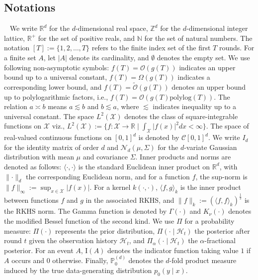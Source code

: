 \documentclass[final,12pt]{colt2026} %
\begin{document}
\subsection{Notations}~\label{sec:notation}
We write $\mathbb{R}^{d}$ for the $d$-dimensional real space, $\mathbb{Z}^{d}$ for the $d$-dimensional integer lattice, $\mathbb{R}^{+}$ for the set of positive reals, and $\mathbb{N}$ for the set of natural numbers. The notation $[T]:=\{1, 2, \ldots, T\}$ refers to the finite index set of the first $T$ rounds. For a finite set $A$, let $|A|$ denote its cardinality, and $\emptyset$ denotes the empty set. We use following non-asymptotic symbols: $f(T) = \mathcal{O}(g(T))$ indicates an upper bound up to a universal constant, $f(T) = \Omega(g(T))$ indicates a corresponding lower bound, and $f(T) = \tilde{\mathcal{O}}(g(T))$ denotes an upper bound up to polylogarithmic factors, i.e., $f(T) = \mathcal{O}(g(T)\mathrm{polylog}(T))$. The relation $a\asymp b$ means $a\lesssim b$ and $b\lesssim a$, where $\lesssim$ indicates inequality up to a universal constant. The space $L^{2}(\mathcal X)$ denotes the class of square-integrable functions on $\mathcal X$ viz., $L^{2}(\mathcal X) := \{f:\mathcal X\to \mathbb{R} \mid \int_{\mathcal X}|f(x)|^2dx < \infty\}$. The space of real-valued continuous functions on $[0, 1]^{d}$ is denoted by $\mathcal{C}[0, 1]^{d}$. We write $I_{d}$ for the identity matrix of order $d$ and $\mathcal{N}_{d}(\mu, \Sigma)$ for the $d$-variate Gaussian distribution with mean $\mu$ and covariance $\Sigma$. Inner products and norms are denoted as follows: $\langle \cdot, \cdot\rangle$ is the standard Euclidean inner product on $\mathbb{R}^{d}$, with $\lVert \cdot \rVert_{d}$ the corresponding Euclidean norm, and for a function $f$, the sup-norm is $\lVert f\rVert_{\infty} := \sup_{x\in \mathcal X}|f(x)|$. For a kernel $k(\cdot, \cdot)$, $\langle f, g\rangle_k$ is the inner product between functions $f$ and $g$ in the associated RKHS, and $\lVert f\rVert_{k}:= (\langle f, f\rangle_{k})^{\frac{1}{2}}$ is the RKHS norm. The Gamma function is denoted by $\Gamma(\cdot)$ and $K_{\nu}(\cdot)$ denotes the modified Bessel function of the second kind. We use $\Pi$ for a probability measure: $\Pi(\cdot)$ represents the prior distribution, $\Pi(\cdot\mid \mathcal H_t)$ the posterior after round $t$ given the observation history $\mathcal H_t$, and $\Pi_{ \alpha}(\cdot\mid \mathcal H_t)$ the $\alpha$-fractional posterior. For an event $A$, $\text{I}(A)$ denotes the indicator function taking value $1$ if $A$ occurs and $0$ otherwise. Finally, $\mathbb{P}_0^{(d)}$ denotes the $d$-fold product measure induced by the true data-generating distribution $p_0(y\mid x)$. 
\end{document}
